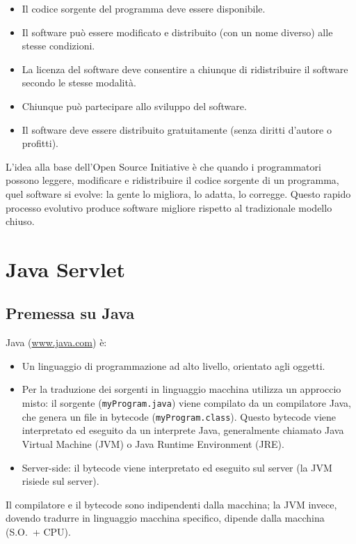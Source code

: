 \begin{itemize}
    \item Il codice sorgente del programma deve essere disponibile.
    \item Il software può essere modificato e distribuito (con un nome diverso) alle stesse condizioni.
    \item La licenza del software deve consentire a chiunque di ridistribuire il software secondo le stesse modalità.
    \item Chiunque può partecipare allo sviluppo del software.
    \item Il software deve essere distribuito gratuitamente (senza diritti d'autore o profitti).
\end{itemize}

L'idea alla base dell'Open Source Initiative è che quando i programmatori possono leggere, modificare e ridistribuire il codice sorgente di un programma, quel software si evolve: la gente lo migliora, lo adatta, lo corregge. Questo rapido processo evolutivo produce software migliore rispetto al tradizionale modello chiuso.

\section{Java Servlet}

\subsection{Premessa su Java}

Java (\url{www.java.com}) è:

\begin{itemize}
    \item Un linguaggio di programmazione ad alto livello, orientato agli oggetti.
    \item Per la traduzione dei sorgenti in linguaggio macchina utilizza un approccio misto: il sorgente (\texttt{myProgram.java}) viene compilato da un compilatore Java, che genera un file in bytecode (\texttt{myProgram.class}). Questo bytecode viene interpretato ed eseguito da un interprete Java, generalmente chiamato Java Virtual Machine (JVM) o Java Runtime Environment (JRE).
    \item Server-side: il bytecode viene interpretato ed eseguito sul server (la JVM risiede sul server).
\end{itemize}

Il compilatore e il bytecode sono indipendenti dalla macchina; la JVM invece, dovendo tradurre in linguaggio macchina specifico, dipende dalla macchina (S.O.\ + CPU).

